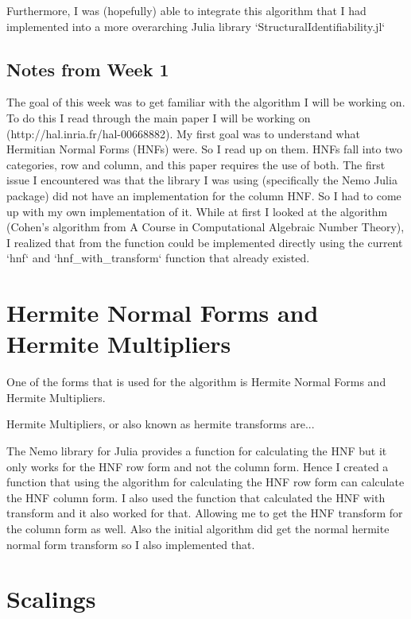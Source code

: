 \documentclass[oneside, a4paper, onecolumn, 11pt]{article}
\begin{document}
Furthermore, I was (hopefully) able to integrate this algorithm that I had implemented into a more overarching Julia library `StructuralIdentifiability.jl`

\subsection*{Notes from Week 1}

The goal of this week was to get familiar with the algorithm I will be working on. To do this I read through the main paper I will be working on (http://hal.inria.fr/hal-00668882). My first goal was to understand what Hermitian Normal Forms (HNFs) were. So I read up on them. HNFs fall into two categories, row and column, and this paper requires the use of both. The first issue I encountered was that the library I was using (specifically the Nemo Julia package) did not have an implementation for the column HNF. So I had to come up with my own implementation of it. While at first I looked at the algorithm (Cohen's algorithm from A Course in Computational Algebraic Number Theory), I realized that from the function could be implemented directly using the current `hnf` and `hnf\_with\_transform` function that already existed.

\section{Hermite Normal Forms and Hermite Multipliers}

One of the forms that is used for the algorithm is Hermite Normal Forms and Hermite Multipliers.

Hermite Multipliers, or also known as hermite transforms are...

The Nemo library for Julia provides a function for calculating the HNF but it only works for the HNF row form and not the column form. Hence I created a function that using the algorithm for calculating the HNF row form can calculate the HNF column form. I also used the function that calculated the HNF with transform and it also worked for that. Allowing me to get the HNF transform for the column form as well. Also the initial algorithm did get the normal hermite normal form transform so I also implemented that.


\section{Scalings}
\end{document}
